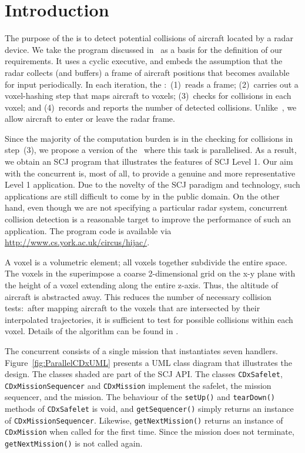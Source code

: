 \section{Introduction}


The purpose of the {\CDx} is to detect potential collisions of aircraft located by a radar device. We take the program discussed in~\cite{KHPPTV09} as a basis for the definition of our requirements. It uses a cyclic executive, and embeds the assumption that the radar collects (and buffers) a frame of aircraft positions that becomes available for input periodically. In each iteration, the \CDx:~(1)~reads a frame; (2)~carries out a voxel-hashing step that maps aircraft to voxels; (3)~checks for collisions in each voxel; and (4)~records and reports the number of detected collisions. Unlike~\cite{KHPPTV09}, we allow aircraft to enter or leave the radar frame.

Since the majority of the computation burden is in the checking for collisions in step~(3), we propose a version of the \CDx\ where this task is parallelised. As a result, we obtain an SCJ program that illustrates the features of SCJ Level 1. Our aim with the concurrent {\CDx} is, most of all, to provide a genuine and more representative Level 1 application. Due to the novelty of the SCJ paradigm and technology, such applications are still difficult to come by in the public domain. On the other hand, even though we are not specifying a particular radar system, concurrent collision detection is a reasonable target to improve the performance of such an application. The program code is available via \url{http://www.cs.york.ac.uk/circus/hijac/}.

A voxel is a volumetric element; all voxels together subdivide the entire space. The voxels in the {\CDx} superimpose a coarse 2-dimensional grid on the x-y plane with the height of a voxel extending along the entire z-axis. Thus, the altitude of aircraft is abstracted away. This reduces the number of necessary collision tests:~after mapping aircraft to the voxels that are intersected by their interpolated trajectories, it is sufficient to test for possible collisions within each voxel. Details of the algorithm can be found in \cite{KHPPTV09}.

The concurrent {\CDx} consists of a single mission that instantiates seven handlers. Figure~\ref{fig:ParallelCDxUML} presents a UML class diagram that illustrates the design. The classes shaded are part of the SCJ API. The classes \verb"CDxSafelet", \verb"CDxMissionSequencer" and \verb"CDxMission" implement the safelet, the mission sequencer, and the mission. The behaviour of the \verb"setUp()" and \verb"tearDown()" methods of \verb"CDxSafelet" is void, and \verb"getSequencer()" simply returns an instance of \verb"CDxMissionSequencer". Likewise, \verb"getNextMission()" returns an instance of \verb"CDxMission" when called for the first time. Since the mission does not terminate, \verb"getNextMission()" is not called again.

